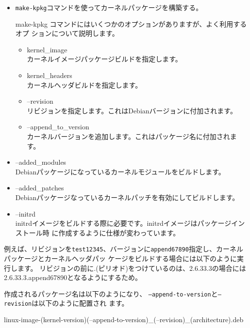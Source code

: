 \begin{frame}[containsverbatim]%

\begin{itemize}

\item \texttt{make-kpkg}コマンドを使ってカーネルパッケージを構築する。

make-kpkg コマンドにはいくつかのオプションがありますが、よく利用するオプ
      ションについて説明します。
\begin{itemize}
\item kernel\_image \\
カーネルイメージパッケージビルドを指定します。
\item kernel\_headers \\
カーネルヘッダビルドを指定します。
\item --revision \\
リビジョンを指定します。これはDebianバージョンに付加されます。
\item --append\_to\_version\\
カーネルバージョンを追加します。これはパッケージ名に付加されます。
\end{itemize}
\end{itemize}
\end{frame}

\begin{frame}
\begin{itemize}
\item --added\_modules\\
Debianパッケージになっているカーネルモジュールをビルドします。
\item --added\_patches\\
Debianパッケージなっているカーネルパッチを有効にしてビルドします。
\item --initrd \\
initrdイメージをビルドする際に必要です。initrdイメージはパッケージインストール時
      に作成するように仕様が変わっています。
\end{itemize}
\end{frame}


\begin{frame}[containsverbatim]%

例えば、リビジョンを\texttt{test12345}、バージョンに\texttt{append67890}指定し、カーネルパッケージとカーネルヘッダパッ
      ケージをビルドする場合には以下のように実行します。
      リビジョンの前に.(ピリオド)をつけているのは、2.6.33.3の場合には
      2.6.33.3.append67890となるようにするため。 

作成されるパッケージ名は以下のようになり、
\texttt{--append-to-version}と\texttt{--revision}は以下のように配置され
      ます。
\begin{commandline}
linux-image-(kernel-version)(--append-to-version)_(--revision)_(architecture).deb 
\end{commandline}


\end{frame}

